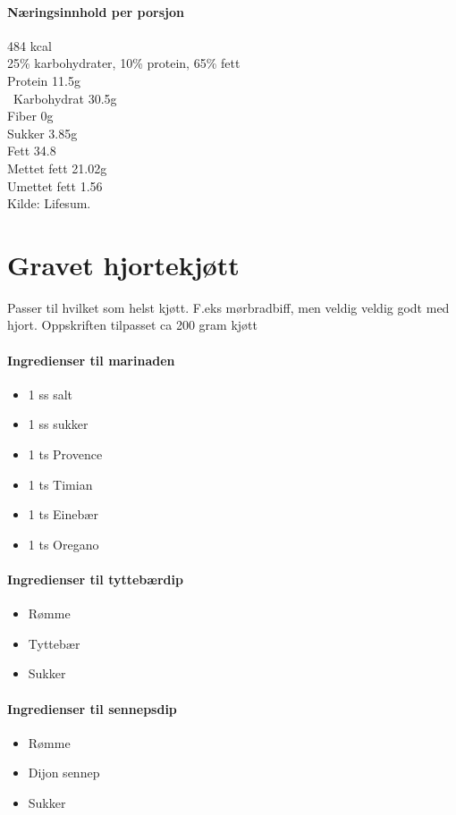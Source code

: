 \documentclass[12pt,a4paper]{book}
\begin{document}
\paragraph{Næringsinnhold per porsjon}
484 kcal\\
25\% karbohydrater, 10\% protein, 65\% fett\\
Protein 11.5g\\\
Karbohydrat 30.5g\\
Fiber 0g\\
Sukker 3.85g\\
Fett 34.8\\
Mettet fett 21.02g\\
Umettet fett 1.56\\
Kilde: Lifesum.
\clearpage{}
\clearpage{}\section{﻿Gravet hjortekjøtt}
Passer til hvilket som helst kjøtt. F.eks mørbradbiff, men veldig veldig godt med hjort.
Oppskriften tilpasset ca 200 gram kjøtt

\paragraph{Ingredienser til marinaden}
\begin{itemize}[noitemsep]
	\item 1 ss salt
	\item 1 ss sukker
	\item 1 ts Provence
	\item 1 ts Timian
	\item 1 ts Einebær
	\item 1 ts Oregano
\end{itemize}

\paragraph{Ingredienser til tyttebærdip}
\begin{itemize}[noitemsep]
	\item Rømme
	\item Tyttebær
	\item Sukker
\end{itemize}

\paragraph{Ingredienser til sennepsdip}
\begin{itemize}[noitemsep]
	\item Rømme
	\item Dijon sennep
	\item Sukker
\end{itemize}
\end{document}
